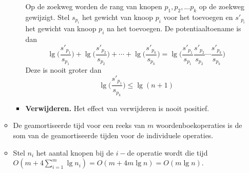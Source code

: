 \begin{itemize}
\begin{itemize}
\begin{itemize}
            Op de zoekweg worden de rang van knopen $p_1,p_2, ... p_k$ op de zoekweg gewijzigt. Stel $s_{p_{i}}$ het gewicht van knoop $p_i$ voor het toevoegen en $s'_{p_{i}}$ het gewicht van knoop $p_i$ na het toevoegen. De potentiaaltoename is dan
            $$\lg\bigg(\frac{s'_{p_{1}}}{s_{p_{1}}}\bigg) + \lg\bigg(\frac{s'_{p_{2}}}{s_{p_{2}}}\bigg) + \cdots + \lg\bigg(\frac{s'_{p_{k}}}{s_{p_{k}}}\bigg) = \lg\bigg(\frac{s'_{p_{1}}}{s_{p_{1}}}\frac{s'_{p_{2}}}{s_{p_{2}}}\cdots\frac{s'_{p_{k}}}{s_{p_{k}}}\bigg)$$
            Deze is nooit groter dan $$\lg\bigg(\frac{s'_{p_{1}}}{s_{p_{k}}}\bigg) \leq \lg(n + 1)$$
            \item \textbf{Verwijderen.} Het effect van verwijderen is nooit positief.
        \end{itemize}
        \item De geamortiseerde tijd voor een reeks van $m$ woordenboekoperaties is de som van de geamortiseerde tijden voor de individuele operaties.
        \item Stel $n_i$ het aantal knopen bij de $i-$de operatie wordt die tijd $O(m + 4\sum_{i=1}^m\lg n_i) = O(m + 4m\lg n) = O(m\lg n)$.
    \end{itemize}
\end{itemize}

